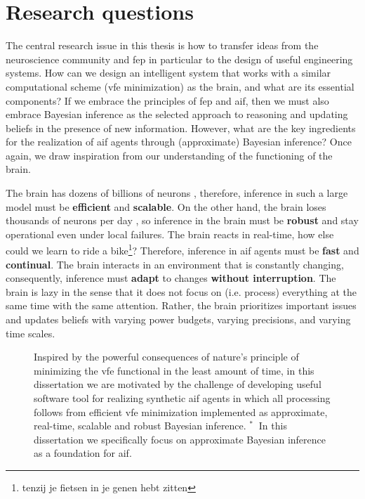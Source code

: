\section{Research questions}\label{chapter-01:section:questions}



The central research issue in this thesis is how to transfer ideas from the neuroscience community and \ac{fep} in particular to the design of useful engineering systems.
How can we design an intelligent system that works with a similar computational scheme (\ac{vfe} minimization) as the brain, and what are its essential components? If we embrace the principles of \ac{fep} and \ac{aif}, then we must also embrace Bayesian inference as the selected approach to reasoning and updating beliefs in the presence of new information.
However, what are the key ingredients for the realization of \ac{aif} agents through (approximate) Bayesian inference?
Once again, we draw inspiration from our understanding of the functioning of the brain.

The brain has dozens of billions of neurons \citep{herculano-houzel_human_2009}, therefore,
inference in such a large model must be \textbf{efficient} and \textbf{scalable}.
On the other hand, the brain loses thousands of neurons per day \citep{barrett_optimal_2016},
so inference in the brain must be \textbf{robust} and stay operational even under local failures.
The brain reacts in real-time, how else could we learn to ride a bike\footnote{tenzij je fietsen in je genen hebt zitten}? 
Therefore, inference in \ac{aif} agents must be \textbf{fast} and
\textbf{continual}.
The brain interacts in an environment that is constantly changing, consequently, inference
must \textbf{adapt} to changes \textbf{without interruption}.
The brain is lazy in the sense that it does not focus on (i.e. process) everything at the same time with the same attention.
Rather, the brain prioritizes important issues and updates beliefs with varying power budgets, varying precisions, and varying time scales.

\begin{figure}
  \centering
  \resizebox{1.0\textwidth}{!}{}
  \caption{
    Inspired by the powerful consequences of nature's principle of minimizing the \ac{vfe}
functional in the least amount of time, in this dissertation we are motivated by the challenge of
developing useful software tool for realizing synthetic \ac{aif} agents in which all processing follows 
from efficient \ac{vfe} minimization implemented as approximate, real-time, scalable and robust Bayesian inference. 
$\mathbin{^*\!~}$ In this dissertation we specifically focus on approximate Bayesian inference as a foundation for \ac{aif}.
  }
\end{figure}

